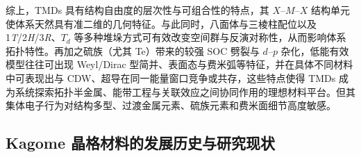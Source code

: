 


综上，TMDs 具有结构自由度的层次性与可组合性的特点，其 $X$--$M$--$X$ 结构单元使体系天然具有准二维的几何特征。与此同时，八面体与三棱柱配位以及 1\textit{T}/2\textit{H}/3\textit{R}、$T_d$ 等多种堆垛方式可有效改变空间群与反演对称性，从而影响体系拓扑特性。再加之硫族（尤其 Te）带来的较强 SOC 劈裂与 $d$--$p$ 杂化，低能有效模型往往可出现 Weyl/Dirac 型简并、表面态与费米弧等特征，并在具体不同材料中可表现出与 CDW、超导在同一能量窗口竞争或共存，这些特点使得 TMDs 成为系统探索拓扑半金属、能带工程与关联效应之间协同作用的理想材料平台。但其集体电子行为对结构多型、过渡金属元素、硫族元素和费米面细节高度敏感。

\subsection{Kagome 晶格材料的发展历史与研究现状}

